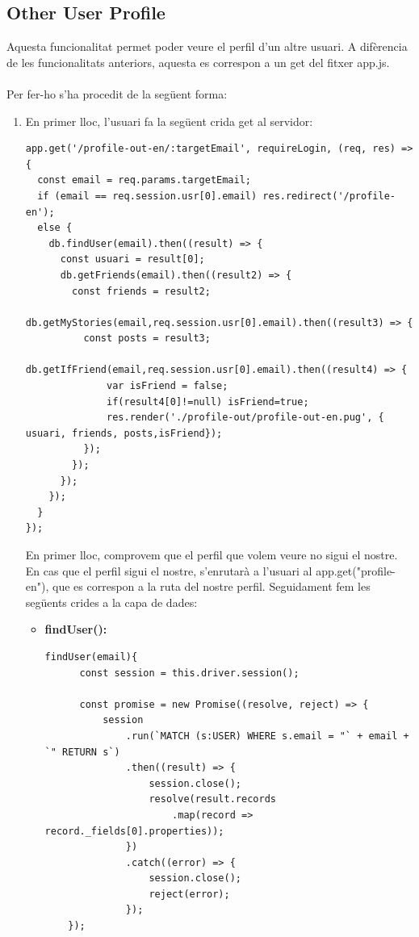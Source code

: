\documentclass[11pt,catalan,listoffigures,listoftables]{tfgetsinf}
\begin{document}
\subsection{Other User Profile}
Aquesta funcionalitat permet poder veure el perfil d'un altre usuari. A difèrencia de les funcionalitats anteriors, aquesta es correspon a un get del fitxer app.js.\\ \\
Per fer-ho s'ha procedit de la següent forma:
\begin{enumerate}
\item En primer lloc, l'usuari fa la següent crida get al servidor:
\begin{lstlisting}
app.get('/profile-out-en/:targetEmail', requireLogin, (req, res) => {
  const email = req.params.targetEmail;
  if (email == req.session.usr[0].email) res.redirect('/profile-en');
  else {
    db.findUser(email).then((result) => {
      const usuari = result[0];
      db.getFriends(email).then((result2) => {
        const friends = result2;
        db.getMyStories(email,req.session.usr[0].email).then((result3) => {
          const posts = result3;
          db.getIfFriend(email,req.session.usr[0].email).then((result4) => {
              var isFriend = false;
              if(result4[0]!=null) isFriend=true;
              res.render('./profile-out/profile-out-en.pug', { usuari, friends, posts,isFriend});
          });
        });
      });
    });
  }
});
\end{lstlisting}
En primer lloc, comprovem que el perfil que volem veure no sigui el nostre. En cas que el perfil sigui el nostre, s'enrutarà a l'usuari al app.get("profile-en"), que es correspon a la ruta del nostre perfil. Seguidament fem les següents crides a la capa de dades:
\begin{itemize}
\item \textbf{findUser():}
\begin{lstlisting}
findUser(email){
      const session = this.driver.session();

      const promise = new Promise((resolve, reject) => {
          session
              .run(`MATCH (s:USER) WHERE s.email = "` + email + `" RETURN s`)
              .then((result) => {
                  session.close();
                  resolve(result.records
                      .map(record => record._fields[0].properties));
              })
              .catch((error) => {
                  session.close();
                  reject(error);
              });
    });


\end{lstlisting}
\end{itemize}
\end{enumerate}
\end{document}
